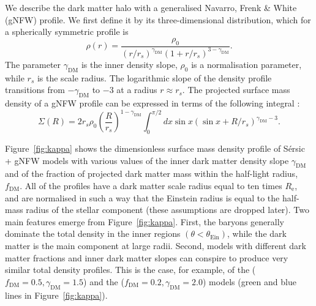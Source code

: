 \documentclass{aa}
\def\reff{R_{\mathrm{e}}}
\def\gammadm{\gamma_{\mathrm{DM}}}
\def\fdm{f_{\mathrm{DM}}}
\def\tein{\theta_{\mathrm{Ein}}}
\def\Fref#1{Figure~\ref{#1}\xspace}
\begin{document}
We describe the dark matter halo with a generalised Navarro, Frenk \& White (gNFW) profile.
We first define it by its three-dimensional distribution, which for a spherically symmetric profile is
\begin{equation}
\rho(r) = \dfrac{\rho_0}{(r/r_s)^{\gammadm}\left(1 + r/r_s\right)^{3-\gammadm}}.
\end{equation}
The parameter $\gammadm$ is the inner density slope, $\rho_0$ is a normalisation parameter, while $r_s$ is the scale radius. The logarithmic slope of the density profile transitions from $-\gammadm$ to $-3$ at a radius $r\approx r_s$.
The projected surface mass density of a gNFW profile can be expressed in terms of the following integral \citep{WTS01}:
\begin{equation}
\Sigma(R) = 2r_s\rho_0 \left(\frac{R}{r_s}\right)^{1-\gammadm}\int_0^{\pi/2} dx \sin{x}(\sin{x} + R/r_s)^{\gammadm-3}.
\end{equation}

\Fref{fig:kappa} shows the dimensionless surface mass density profile of S\'{e}rsic + gNFW models with various values of the inner dark matter density slope $\gammadm$ and of the fraction of projected dark matter mass within the half-light radius, $\fdm$.
All of the profiles have 
a dark matter scale radius equal to ten times $\reff$, and are normalised in such a way that the Einstein radius is equal to the half-mass radius of the stellar component (these assumptions are dropped later).
Two main features emerge from \Fref{fig:kappa}. First, the baryons generally dominate the total density in the inner regions $(\theta < \tein)$, while the dark matter is the main component at large radii.
Second, models with different dark matter fractions and inner dark matter slopes can conspire to produce very similar total density profiles. 
This is the case, for example, of the ($\fdm=0.5,\gammadm=1.5$) and the ($\fdm=0.2,\gammadm=2.0$) models (green and blue lines in \Fref{fig:kappa}).
\end{document}
